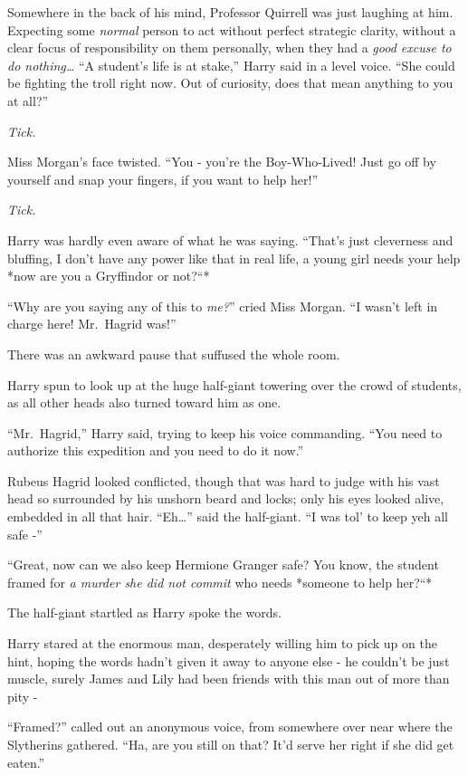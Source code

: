 Somewhere in the back of his mind, Professor Quirrell was just laughing
at him. Expecting some \emph{normal} person to act without perfect
strategic clarity, without a clear focus of responsibility on them
personally, when they had a \emph{good excuse to do nothing\ldots{}} ``A
student's life is at stake,'' Harry said in a level voice. ``She could
be fighting the troll right now. Out of curiosity, does that mean
anything to you at all?''

\emph{Tick.}

Miss Morgan's face twisted. ``You - you're the Boy-Who-Lived! Just go
off by yourself and snap your fingers, if you want to help her!''

\emph{Tick.}

Harry was hardly even aware of what he was saying. ``That's just
cleverness and bluffing, I don't have any power like that in real life,
a young girl needs your help *now are you a Gryffindor or not?``*

``Why are you saying any of this to \emph{me?}'' cried Miss Morgan. ``I
wasn't left in charge here! Mr.~Hagrid was!''

There was an awkward pause that suffused the whole room.

Harry spun to look up at the huge half-giant towering over the crowd of
students, as all other heads also turned toward him as one.

``Mr.~Hagrid,'' Harry said, trying to keep his voice commanding. ``You
need to authorize this expedition and you need to do it now.''

Rubeus Hagrid looked conflicted, though that was hard to judge with his
vast head so surrounded by his unshorn beard and locks; only his eyes
looked alive, embedded in all that hair. ``Eh\ldots{}'' said the
half-giant. ``I was tol' to keep yeh all safe -''

``Great, now can we also keep Hermione Granger safe? You know, the
student framed for \emph{a murder she did not commit} who needs *someone
to help her?``*

The half-giant startled as Harry spoke the words.

Harry stared at the enormous man, desperately willing him to pick up on
the hint, hoping the words hadn't given it away to anyone else - he
couldn't be just muscle, surely James and Lily had been friends with
this man out of more than pity -

``Framed?'' called out an anonymous voice, from somewhere over near
where the Slytherins gathered. ``Ha, are you still on that? It'd serve
her right if she did get eaten.''

